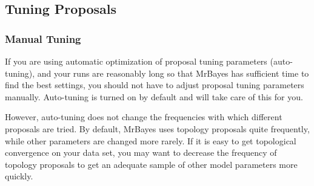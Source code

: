 \documentclass[12pt]{book}
\newcommand{\ttt}[1]{\texttt{#1}}
\newcommand{\tb}[1]{\ttt{\textbf{#1}}}
\begin{document}
% 

\subsection{Tuning Proposals}

\subsubsection{Manual Tuning}

If you are using automatic optimization of proposal tuning parameters (auto-tuning), and your runs
are reasonably long so that MrBayes has sufficient time to find the best settings, you should not
have to adjust proposal tuning parameters manually. Auto-tuning is turned on by default and will
take care of this for you.

However, auto-tuning does not change the frequencies with which different proposals are tried. By
default, MrBayes uses topology proposals quite frequently, while other parameters are changed more
rarely. If it is easy to get topological convergence on your data set, you may want to decrease the
frequency of topology proposals to get an adequate sample of other model parameters more quickly.
\end{document}

